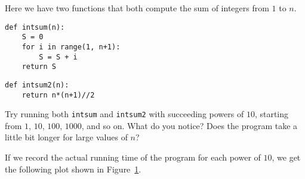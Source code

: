 \begin{example}[Benchmarking]
\label{ex:running_time}


Here we have two functions that both compute the sum of integers from $1$ to $n$.

\begin{minipage}{0.45\textwidth}
\begin{listing}[H]
\begin{verbatim}
def intsum(n):
    S = 0
    for i in range(1, n+1):
        S = S + i
    return S
\end{verbatim}
\label{lst:intsum}
\end{listing}
\end{minipage}\hfill
\begin{minipage}{0.45\textwidth}
\begin{listing}[H]
\begin{verbatim}
def intsum2(n):
    return n*(n+1)//2
\end{verbatim}
\label{lst:intsum2}
\end{listing}
\end{minipage}

Try running both \texttt{intsum} and \texttt{intsum2} with succeeding powers of $10$, starting from $1$, $10$, $100$, $1000$, and so on. What do you notice? Does the program take a little bit longer for large values of $n$?

If we record the actual running time of the program for each power of $10$, we get the following plot shown in Figure~\ref{fig:intsum_runtime}.

\begin{figure}[H]
	\centering
	\label{fig:intsum_runtime}
\end{figure}


\end{example}
